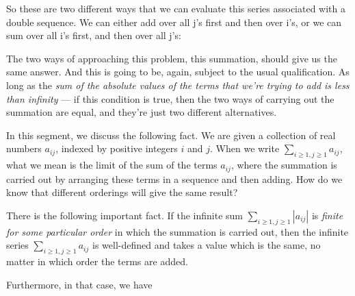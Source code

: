\documentclass[pdftex, brazil, 12pt, twoside]{article}
\begin{document}
So these are two different ways that we can evaluate this
series associated with a double sequence.
We can either add over all j's first and then over i's, or we
can sum over all i's first, and then over all j's:

\begin{figure}[H]
  \begin{center}
  \end{center}
\end{figure}

The two ways of approaching this problem, this summation,
should give us the same answer.
And this is going to be, again, subject to the usual
qualification.
As long as the \emph{sum of the absolute values of the terms
that we're trying to add is less than infinity} ---
if this condition is true, then the two ways of carrying
out the summation are equal, and they're just two different
alternatives.

In this segment, we discuss the following fact. We are given a collection
of real numbers $a_{ij}$, indexed by positive integers $i$ and $j$.
When we write $\sum_{i \ge 1, j \ge 1} a_{ij}$, what we mean is the
limit of the sum of the terms $a_{ij}$, where the summation is carried
out by arranging these terms in a sequence and then adding.
How do we know that different orderings will give the same result?

There is the following important fact. If the infinite sum 
$\sum_{i \ge 1, j \ge 1} |a_{ij}|$ is \emph{finite for some particular order}
in which the summation is carried out, then the infinite series
$\sum_{i \ge 1, j \ge 1} a_{ij}$ is well-defined and takes a value which is
the same, no matter in which order the terms are added.

Furthermore, in that case, we have
\end{document}
